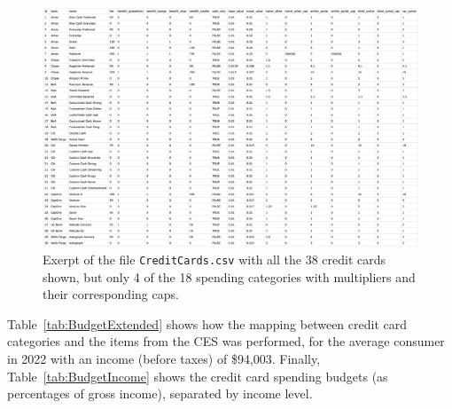 \begin{landscape}
    \begin{figure}[t!h]
        \begin{center}
        \includegraphics[scale=0.45]{../Misc/CreditCardsCSV.png}
        \caption{Exerpt of the file \texttt{CreditCards.csv} with all the 38 credit cards shown, but only 4 of the 18 spending categories with multipliers and their corresponding caps.}
        \label{fig:CreditCardsCSV}
        \end{center}
    \end{figure}
\end{landscape}



Table~\ref{tab:BudgetExtended} shows how the mapping between credit card categories and the items from the CES was performed, for the average consumer in 2022 with an income (before taxes) of \$94,003.
Finally, Table~\ref{tab:BudgetIncome} shows the credit card spending budgets (as percentages of gross income), separated by income level. 

\begin{landscape}
    
    
\end{landscape}